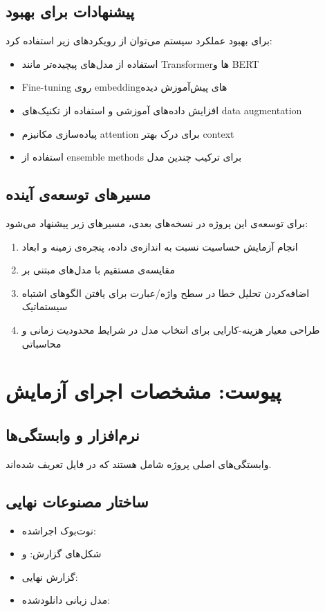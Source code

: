 \documentclass[12pt,a4paper]{article}
\begin{document}
\subsection{پیشنهادات برای بهبود}
برای بهبود عملکرد سیستم می‌توان از رویکردهای زیر استفاده کرد:
\begin{itemize}
\item استفاده از مدل‌های پیچیده‌تر مانند Transformerها و BERT
\item Fine-tuning روی embeddingهای پیش‌آموزش دیده
\item افزایش داده‌های آموزشی و استفاده از تکنیک‌های data augmentation
\item پیاده‌سازی مکانیزم attention برای درک بهتر context
\item استفاده از ensemble methods برای ترکیب چندین مدل
\end{itemize}

\subsection{مسیرهای توسعه‌ی آینده}
برای توسعه‌ی این پروژه در نسخه‌های بعدی، مسیرهای زیر پیشنهاد می‌شود:
\begin{enumerate}
\item انجام آزمایش حساسیت نسبت به اندازه‌ی داده، پنجره‌ی زمینه و ابعاد 
\item مقایسه‌ی مستقیم  با مدل‌های  مبتنی بر 
\item اضافه‌کردن تحلیل خطا در سطح واژه/عبارت برای یافتن الگوهای اشتباه سیستماتیک
\item طراحی معیار هزینه-کارایی برای انتخاب مدل در شرایط محدودیت زمانی و محاسباتی
\end{enumerate}

\section{پیوست: مشخصات اجرای آزمایش}
\subsection{نرم‌افزار و وابستگی‌ها}
وابستگی‌های اصلی پروژه شامل  هستند که در فایل  تعریف شده‌اند.

\subsection{ساختار مصنوعات نهایی}
\begin{itemize}
\item نوت‌بوک اجراشده: 
\item شکل‌های گزارش:  و 
\item گزارش نهایی: 
\item مدل زبانی دانلودشده: 
\end{itemize}
\end{document}
